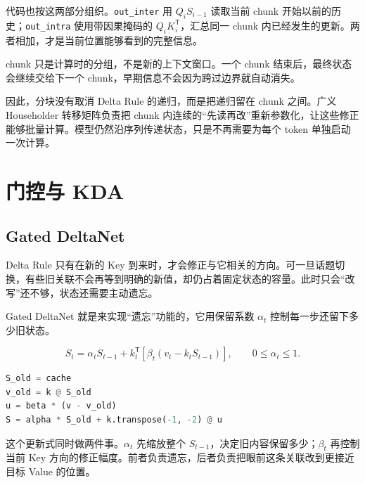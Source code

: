 代码也按这两部分组织。\texttt{out\_inter} 用 $Q_iS_{i-1}$ 读取当前 chunk 开始以前的历史；\texttt{out\_intra} 使用带因果掩码的 $Q_iK_i^{\mathsf T}$，汇总同一 chunk 内已经发生的更新。两者相加，才是当前位置能够看到的完整信息。

chunk 只是计算时的分组，不是新的上下文窗口。一个 chunk 结束后，最终状态会继续交给下一个 chunk，早期信息不会因为跨过边界就自动消失。

因此，分块没有取消 Delta Rule 的递归，而是把递归留在 chunk 之间。广义 Householder 转移矩阵负责把 chunk 内连续的“先读再改”重新参数化，让这些修正能够批量计算。模型仍然沿序列传递状态，只是不再需要为每个 token 单独启动一次计算。

\section{门控与 KDA}

\subsection{Gated DeltaNet}

Delta Rule 只有在新的 Key 到来时，才会修正与它相关的方向。可一旦话题切换，有些旧关联不会再等到明确的新值，却仍占着固定状态的容量。此时只会“改写”还不够，状态还需要主动遗忘。

Gated DeltaNet 就是来实现“遗忘”功能的，它用保留系数 $\alpha_t$ 控制每一步还留下多少旧状态。\cite{gated-delta}

\[
S_t=
\alpha_t S_{t-1}
+k_t^{\mathsf T}
\left[\beta_t\left(v_t-k_tS_{t-1}\right)\right],
\qquad 0\leq\alpha_t\leq1.
\]

\begin{lstlisting}[language=Python,caption={门控与 Delta Rule 的组合}]
S_old = cache
v_old = k @ S_old
u = beta * (v - v_old)
S = alpha * S_old + k.transpose(-1, -2) @ u
\end{lstlisting}

这个更新式同时做两件事。$\alpha_t$ 先缩放整个 $S_{t-1}$，决定旧内容保留多少；$\beta_t$ 再控制当前 Key 方向的修正幅度。前者负责遗忘，后者负责把眼前这条关联改到更接近目标 Value 的位置。

